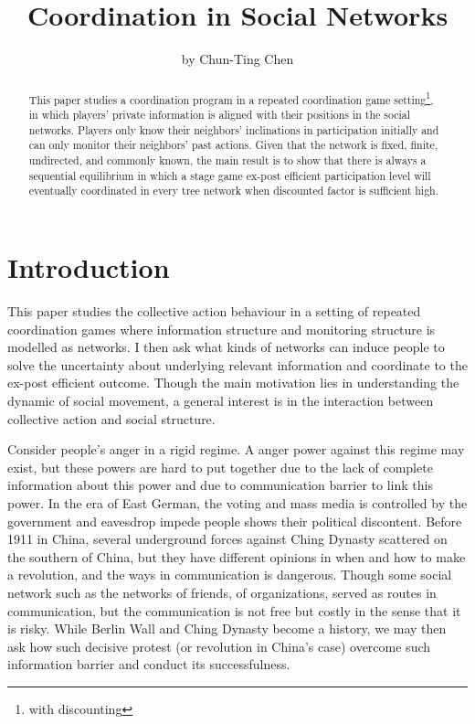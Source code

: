 \documentclass[12pt,letter]{article}
\theoremstyle{remark}
\theoremstyle{remark}
\theoremstyle{claim}
\begin{document}

\title {Coordination in Social Networks}
\author {by Chun-Ting Chen}

\maketitle

\begin{abstract}

This paper studies a coordination program in a repeated coordination game setting\footnote{with discounting}, in which players' private information is aligned with their positions in the social networks. Players only know their neighbors' inclinations in participation initially and can only monitor their neighbors' past actions. Given that the network is fixed, finite, undirected, and commonly known, the main result is to show that there is always a sequential equilibrium in which a stage game ex-post efficient participation level will eventually coordinated in every tree network when discounted factor is sufficient high.



\end{abstract}


\section{Introduction} 

This paper studies the collective action behaviour in a setting of repeated coordination games where information structure and monitoring structure is modelled as networks. I then ask what kinds of networks can induce people to solve the uncertainty about underlying relevant information and coordinate to the ex-post efficient outcome. Though the main motivation lies in understanding the dynamic of social movement, a general interest is in the interaction between collective action and social structure.

Consider people's anger in a rigid regime. A anger power against this regime may exist, but these powers are hard to put together due to the lack of complete information about this power and due to communication barrier to link this power. In the era of East German, the voting and mass media is controlled by the government and eavesdrop impede people shows their political discontent. Before 1911 in China, several underground forces against Ching Dynasty scattered on the southern of China, but they have different opinions in when and how to make a revolution, and the ways in communication is dangerous. Though some social network such as the networks of friends, of organizations, served as routes in communication, but the communication is not free but costly in the sense that it is risky. While Berlin Wall and Ching Dynasty become a history, we may then ask how such decisive protest (or revolution in China's case) overcome such information barrier and conduct its successfulness.
\end{document}
